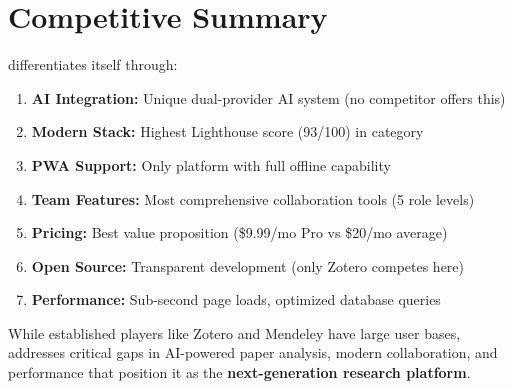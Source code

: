 \section{Competitive Summary}
\label{sec:competitive-summary}

\projectname{} differentiates itself through:

\begin{enumerate}[leftmargin=*]
    \item \textbf{AI Integration:} Unique dual-provider AI system (no competitor offers this)
    \item \textbf{Modern Stack:} Highest Lighthouse score (93/100) in category
    \item \textbf{PWA Support:} Only platform with full offline capability
    \item \textbf{Team Features:} Most comprehensive collaboration tools (5 role levels)
    \item \textbf{Pricing:} Best value proposition (\$9.99/mo Pro vs \$20/mo average)
    \item \textbf{Open Source:} Transparent development (only Zotero competes here)
    \item \textbf{Performance:} Sub-second page loads, optimized database queries
\end{enumerate}

\vspace{0.5cm}
\noindent
While established players like Zotero and Mendeley have large user bases, \projectname{} addresses critical gaps in AI-powered paper analysis, modern collaboration, and performance that position it as the \textbf{next-generation research platform}.
